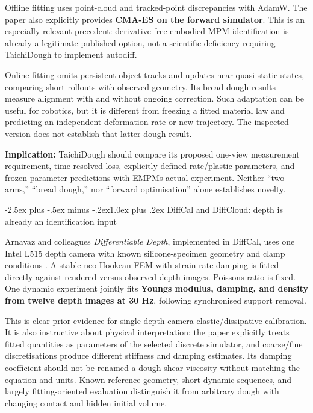 \documentclass[
  11pt,
]{article}
\makeatletter
\renewcommand\subsection{\needspace{5\baselineskip}\@startsection{subsection}{2}{\z@}%
  {-2.5ex plus -.5ex minus -.2ex}{1.0ex plus .2ex}%
  {\normalfont\sffamily\large\bfseries\color{accent}}}
\makeatother
\begin{document}
Offline fitting uses point-cloud and tracked-point discrepancies with
AdamW. The paper also explicitly provides \textbf{CMA-ES on the forward
simulator}. This is an especially relevant precedent: derivative-free
embodied MPM identification is already a legitimate published option,
not a scientific deficiency requiring TaichiDough to implement autodiff.

Online fitting omits persistent object tracks and updates near
quasi-static states, comparing short rollouts with observed geometry.
Its bread-dough results measure alignment with and without ongoing
correction. Such adaptation can be useful for robotics, but it is
different from freezing a fitted material law and predicting an
independent deformation rate or new trajectory. The inspected version
does not establish that latter dough result.

\textbf{Implication:} TaichiDough should compare its proposed one-view
measurement requirement, time-resolved loss, explicitly defined
rate/plastic parameters, and frozen-parameter predictions with
EMPM\textquotesingle s actual experiment. Neither ``two arms,'' ``bread
dough,'' nor ``forward optimisation'' alone establishes novelty.

\subsection{DiffCal and DiffCloud: depth is already an identification
input}\label{diffcal-and-diffcloud-depth-is-already-an-identification-input}

Arnavaz and colleagues\textquotesingle{} \emph{Differentiable Depth},
implemented in DiffCal, uses one Intel L515 depth camera with known
silicone-specimen geometry and clamp conditions
. A stable neo-Hookean FEM with
strain-rate damping is fitted directly against rendered-versus-observed
depth images. Poisson\textquotesingle s ratio is fixed. One dynamic
experiment jointly fits \textbf{Young\textquotesingle s modulus,
damping, and density from twelve depth images at 30 Hz}, following
synchronised support removal.

This is clear prior evidence for single-depth-camera elastic/dissipative
calibration. It is also instructive about physical interpretation: the
paper explicitly treats fitted quantities as parameters of the selected
discrete simulator, and coarse/fine discretisations produce different
stiffness and damping estimates. Its damping coefficient should not be
renamed a dough shear viscosity without matching the equation and units.
Known reference geometry, short dynamic sequences, and largely
fitting-oriented evaluation distinguish it from arbitrary dough with
changing contact and hidden initial volume.
\end{document}
